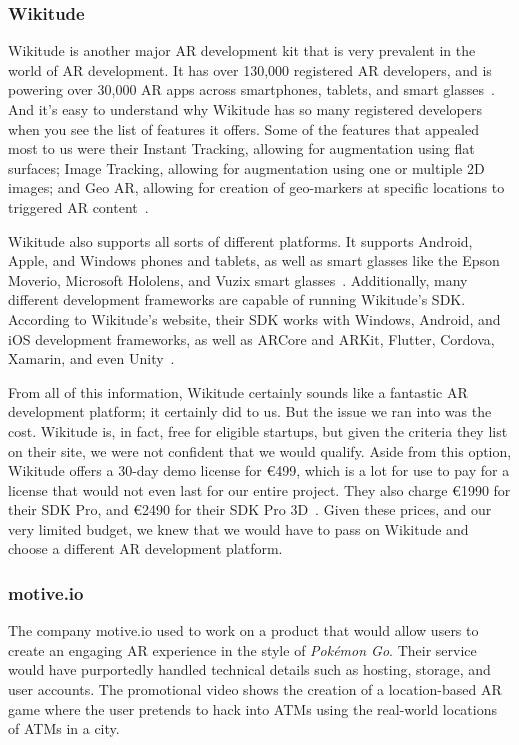\documentclass[a4paper, 10pt, american, titlepage]{article}
\begin{document}
\subsubsection{Wikitude}
\label{sec:wikitude}

Wikitude is another major AR development kit that is very prevalent in the
world of AR development. It has over 130,000 registered AR developers, and is
powering over 30,000 AR apps across smartphones, tablets, and smart
glasses~\autocite{wikitude2018}.  And it's easy to understand why Wikitude has
so many registered developers when you see the list of features it offers. Some
of the features that appealed most to us were their Instant Tracking, allowing
for augmentation using flat surfaces; Image Tracking, allowing for augmentation
using one or multiple 2D images; and Geo AR, allowing for creation of
geo-markers at specific locations to triggered AR
content~\autocite{wikitude2018}.

Wikitude also supports all sorts of different platforms. It supports Android,
Apple, and Windows phones and tablets, as well as smart glasses like the Epson
Moverio, Microsoft Hololens, and Vuzix smart glasses~\autocite{wikitude2018}.
Additionally, many different development frameworks are capable of running
Wikitude's SDK.  According to Wikitude's website, their SDK works with Windows,
Android, and iOS development frameworks, as well as ARCore and ARKit, Flutter,
Cordova, Xamarin, and even Unity~\autocite{wikitude2018}.

From all of this information, Wikitude certainly sounds like a fantastic AR
development platform; it certainly did to us. But the issue we ran into was the
cost. Wikitude is, in fact, free for eligible startups, but given the criteria
they list on their site, we were not confident that we would qualify. Aside
from this option, Wikitude offers a 30-day demo license for \euro{499}, which
is a lot for use to pay for a license that would not even last for our entire
project. They also charge \euro{1990} for their SDK Pro, and \euro{2490} for
their SDK Pro 3D~\autocite{wikitude2018}. Given these prices, and our very
limited budget, we knew that we would have to pass on Wikitude and choose a
different AR development platform.

\subsubsection{motive.io}
\label{sec:motive.io}

The company motive.io used to work on a product that would allow users to create
an engaging AR experience in the style of \textit{Pokémon Go}. Their service
would have purportedly handled technical details such as hosting, storage, and
user accounts. The promotional video shows the creation of a location-based AR
game where the user pretends to hack into ATMs using the real-world locations of
ATMs in a city\autocite{odom2017}.
\end{document}
